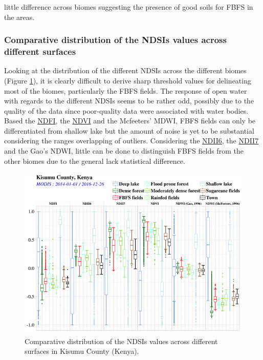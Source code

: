 \documentclass[12pt,oneside]{article}
\begin{document}
little difference across biomes suggesting the presence of good soils for FBFS in the areas.

\hypertarget{II12}{%
\subsubsection{Comparative distribution of the NDSIs values across different surfaces}\label{II12}}

Looking at the distribution of the different NDSIs across the different biomes (Figure \ref{fig:fig4}), it is clearly difficult to derive sharp threshold values for delineating most of the biomes, particularly the FBFS fields. The response of open water with regards to the different NDSIs seems to be rather odd, possibly due to the quality of the data since poor-quality data were associated with water bodies. Based the \href{http://journals.plos.org/plosone/article/file?id=10.1371/journal.pone.0088741\&type=printable}{NDFI}, the \href{https://www.sciencedirect.com/science/article/pii/0034425779900130?via\%3Dihub}{NDVI} and the Mcfeeters' MDWI, FBFS fields can only be differentiated from shallow lake but the amount of noise is yet to be substantial considering the ranges overlapping of outliers. Considering the \href{https://www.sciencedirect.com/science/article/pii/0034425789900461?via\%3Dihub}{NDII6}, the \href{https://www.sciencedirect.com/science/article/pii/0034425789900461?via\%3Dihub}{NDII7} and the Gao's NDWI, little can be done to distinguish FBFS fields from the other biomes due to the general lack statistical difference.

\begin{figure}
\includegraphics[width=1\linewidth]{figures/Mapping_FBFS_ndsi_accross_features} \caption{Comparative distribution of the NDSIs values across different surfaces in Kisumu County (Kenya).}\label{fig:fig4}
\end{figure}
\end{document}
